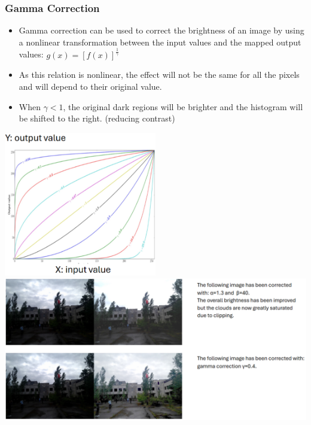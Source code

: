 \documentclass[10pt]{article}
\begin{document}
\subsubsection*{Gamma Correction}
\begin{itemize}
	\item Gamma correction can be used to correct the brightness of an image by using a nonlinear transformation between the input values and the mapped output values: $g(x) = [f(x)]^{\frac{1}{\gamma}}$
	\item As this relation is nonlinear, the effect will not be the same for all the pixels and will depend to their original value.
	\item When $\gamma < 1$, the original dark regions will be brighter and the histogram will be shifted to the right.  (reducing contrast)
\end{itemize}
\begin{center} 
	\includegraphics*[width=0.5\textwidth]{L2_5.png} \\
    \includegraphics*[width=\textwidth]{L2_6.png} 
\end{center}
\end{document}
